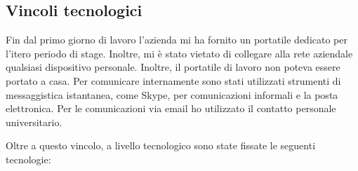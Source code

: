 \subsection{Vincoli tecnologici}

Fin dal primo giorno di lavoro l'azienda mi ha fornito un portatile dedicato 
per l'itero periodo di stage. Inoltre, mi è stato vietato di collegare alla 
rete aziendale qualsiasi dispositivo personale. Inoltre, il portatile di lavoro 
non poteva essere portato a casa.
Per comunicare internamente sono stati utilizzati strumenti di messaggistica 
istantanea, come Skype, per comunicazioni informali e la posta elettronica. 
Per le comunicazioni via email ho utilizzato il contatto personale universitario.

Oltre a questo vincolo, a livello tecnologico sono state fissate le seguenti 
tecnologie:

